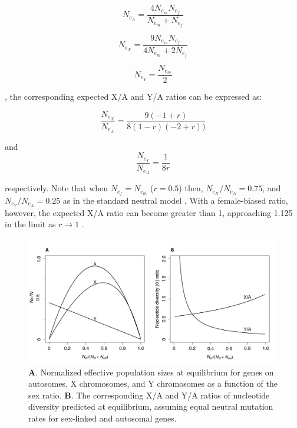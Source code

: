 \documentclass[9pt,twocolumn,twoside,lineno]{gsajnl}
\begin{document}
\begin{equation}
N_{e_{A}} = \frac{4N_{e_{m}}N_{e_{f}}}{N_{e_{m}}+N_{e_{f}}} \label{eq:NeA}
\end{equation}

\begin{equation}
N_{e_{X}} = \frac{9N_{e_{m}}N_{e_{f}}}{4N_{e_{m}}+2N_{e_{f}}} \label{eq:NeX}
\end{equation}

\begin{equation}
N_{e_{Y}} = \frac{N_{e_{m}}}{2} \label{eq:NeY}
\end{equation}

\citep{wright1931evolution}, the corresponding expected X/A and Y/A ratios can be expressed as:

\begin{equation}
\frac{N_{e_{X}}}{N_{e_{A}}} = \frac{9 (-1 + r)}{8 (1 - r) (-2 + r))} \label{eq:XA}
\end{equation}

and
\begin{equation}
\frac{N_{e_{Y}}}{N_{e_{A}}} = \frac{1}{8r} \label{eq:YA}
\end{equation}

respectively.  Note that when $N_{e_{f}} = N_{e_{m}}$ ($r=0.5$) then, $N_{e_{X}}/N_{e_{A}} = 0.75$, and $N_{e_{Y}}/N_{e_{A}} = 0.25$ as in the standard neutral model \citep{wright1931evolution}. With a female-biased ratio, however, the expected X/A ratio can become greater than 1, approaching 1.125 in the limit as $r\rightarrow 1$ \citep{caballero1995}.

\begin{figure}[htbp]
\centering
\noindent
\includegraphics[width=\linewidth]{figure1.jpg}
\caption{\textbf{A}. Normalized effective population sizes at equilibrium for genes on autosomes, X chromosomes, and Y chromosomes as a function of the sex ratio. \textbf{B}. The corresponding X/A and Y/A ratios of nucleotide diversity predicted at equilibrium, assuming equal neutral mutation rates for sex-linked and autosomal genes.
}
\end{figure}
\end{document}
